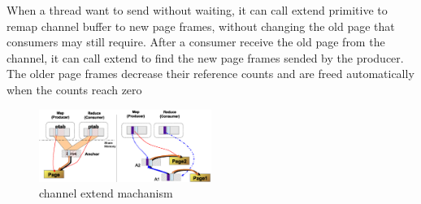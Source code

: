 When a thread want to send without waiting, 
it can call extend primitive to remap channel buffer to new page frames,
without changing the old page 
that consumers may still require. 
After a consumer receive the old page from the channel, 
it can call extend to find the new page frames sended by the
producer.
The older page frames decrease their reference counts and
are freed automatically when the counts reach zero


\begin{figure}[!h!t]  
    \centering
    \includegraphics[width=0.5\textwidth]{eps/spmckern_extend.eps}
    \caption{channel extend machanism}
    \label{fig:spmckern:extend}
\end{figure}















